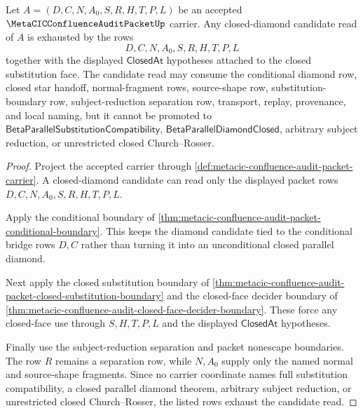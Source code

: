 \begin{theorem}
\label{thm:metacic-confluence-audit-closed-diamond-candidate-exhaustion}
Let $A=(D,C,N,A_0,S,R,H,T,P,L)$ be an accepted $\MetaCICConfluenceAuditPacketUp$ carrier. Any closed-diamond candidate read of $A$ is exhausted by the rows
$$
D,C,N,A_0,S,R,H,T,P,L
$$
together with the displayed $\mathsf{ClosedAt}$ hypotheses attached to the closed substitution face. The candidate read may consume the conditional diamond row, closed star handoff, normal-fragment rows, source-shape row, substitution-boundary row, subject-reduction separation row, transport, replay, provenance, and local naming, but it cannot be promoted to $\mathsf{BetaParallelSubstitutionCompatibility}$, $\mathsf{BetaParallelDiamondClosed}$, arbitrary subject reduction, or unrestricted closed Church--Rosser.
\end{theorem}
\begin{proof}
Project the accepted carrier through \autoref{def:metacic-confluence-audit-packet-carrier}. A closed-diamond candidate can read only the displayed packet rows $D,C,N,A_0,S,R,H,T,P,L$.

Apply the conditional boundary of \autoref{thm:metacic-confluence-audit-packet-conditional-boundary}. This keeps the diamond candidate tied to the conditional bridge rows $D,C$ rather than turning it into an unconditional closed parallel diamond.

Next apply the closed substitution boundary of \autoref{thm:metacic-confluence-audit-packet-closed-substitution-boundary} and the closed-face decider boundary of \autoref{thm:metacic-confluence-audit-closed-face-decider-boundary}. These force any closed-face use through $S,H,T,P,L$ and the displayed $\mathsf{ClosedAt}$ hypotheses.

Finally use the subject-reduction separation and packet nonescape boundaries. The row $R$ remains a separation row, while $N,A_0$ supply only the named normal and source-shape fragments. Since no carrier coordinate names full substitution compatibility, a closed parallel diamond theorem, arbitrary subject reduction, or unrestricted closed Church--Rosser, the listed rows exhaust the candidate read.
\end{proof}

